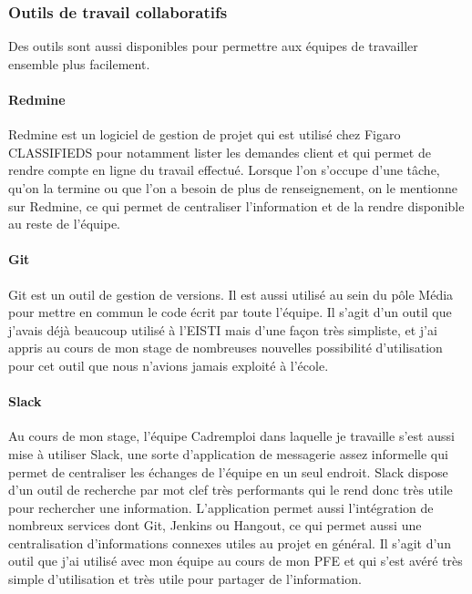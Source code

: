 \subsubsection{Outils de travail collaboratifs}
\label{subs:Outils de travail collaboratifs}
Des outils sont aussi disponibles pour permettre aux équipes de travailler ensemble plus facilement.
\paragraph{Redmine}
\label{par:Redmine}
Redmine est un logiciel de gestion de projet qui est utilisé chez Figaro CLASSIFIEDS pour notamment lister les demandes client et qui permet de rendre compte en ligne du travail effectué.
Lorsque l'on s'occupe d'une tâche, qu'on la termine ou que l'on a besoin de plus de renseignement, on le mentionne sur Redmine, ce qui permet de centraliser l'information et de la rendre disponible au reste de l'équipe.
\paragraph{Git}
\label{par:Git}
Git est un outil de gestion de versions.
Il est aussi utilisé au sein du pôle Média pour mettre en commun le code écrit par toute l'équipe.
Il s'agit d'un outil que j'avais déjà beaucoup utilisé à l'EISTI mais d'une façon très simpliste, et j'ai appris au cours de mon stage de nombreuses nouvelles possibilité d'utilisation pour cet outil que nous n'avions jamais exploité à l'école.
\paragraph{Slack}
\label{par:Slack}
Au cours de mon stage, l'équipe Cadremploi dans laquelle je travaille s'est aussi mise à utiliser Slack, une sorte d'application de messagerie assez informelle qui permet de centraliser les échanges de l'équipe en un seul endroit.
Slack dispose d'un outil de recherche par mot clef très performants qui le rend donc très utile pour rechercher une information.
L'application permet aussi l'intégration de nombreux services dont Git, Jenkins ou Hangout, ce qui permet aussi une centralisation d'informations connexes utiles au projet en général.
Il s'agit d'un outil que j'ai utilisé avec mon équipe au cours de mon PFE et qui s'est avéré très simple d'utilisation et très utile pour partager de l'information.



